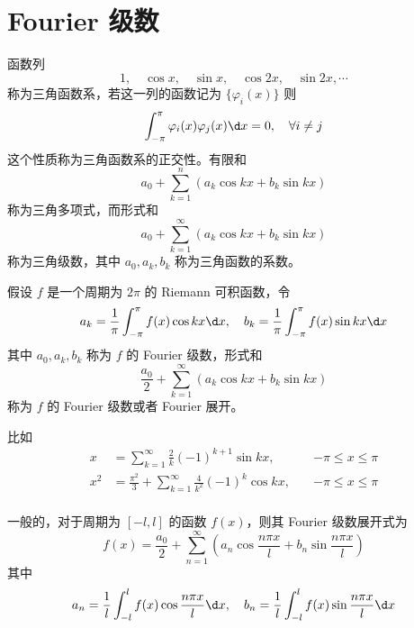 \section{Fourier 级数}

函数列
\[ 1, \quad \cos x, \quad \sin x, \quad \cos 2x, \quad \sin 2x , \cdots \]
称为三角函数系，若这一列的函数记为 $\{\varphi_i(x)\}$ 则
\[ \int_{-\pi}^{\pi} \varphi_i(x) \varphi_j(x) \d x = 0, \quad \forall i \neq j \]
这个性质称为三角函数系的正交性。有限和
\[ a_0 + \sum_{k=1}^n (a_k \cos kx + b_k \sin kx) \]
称为三角多项式，而形式和
\[ a_0 + \sum_{k=1}^\infty (a_k \cos kx + b_k \sin kx) \]
称为三角级数，其中 $a_0, a_k, b_k$ 称为三角函数的系数。

\begin{definition}
	假设 $f$ 是一个周期为 $2\pi$ 的 Riemann 可积函数，令
	\[ a_k = \frac{1}{\pi} \int_{-\pi}^{\pi} f(x) \cos kx \d x, \quad b_k = \frac{1}{\pi} \int_{-\pi}^{\pi} f(x) \sin k x \d x \]
	其中 $a_0, a_k, b_k$ 称为 $f$ 的 Fourier 级数，形式和
	\[ \frac{a_0}{2} + \sum_{k=1}^\infty (a_k \cos k x+ b_k \sin k x) \]
	称为 $f$ 的 Fourier 级数或者 Fourier 展开。
\end{definition}

比如
\[ \begin{aligned}
		x   & = \sum_{k=1}^{\infty} \frac{2}{k} (-1)^{k+1} \sin k x, \quad                   & -\pi \leqslant x \leqslant \pi \\
		x^2 & = \frac{\pi^2}{3} + \sum_{k=1}^{\infty} \frac{4}{k^2} (-1)^{k} \cos k x, \quad & -\pi \leqslant x \leqslant \pi \\
	\end{aligned} \]

一般的，对于周期为 $[-l,l]$ 的函数 $f(x)$，则其 Fourier 级数展开式为
\[ f(x) = \frac{a_0}{2} + \sum_{n=1}^{\infty} \left( a_n \cos \frac{n \pi x}{l} + b_n \sin \frac{n \pi x}{l} \right) \]
其中
\[ a_n = \frac{1}{l} \int_{-l}^{l} f(x) \cos \frac{n \pi x}{l} \d x, \quad b_n = \frac{1}{l} \int_{-l}^{l} f(x) \sin \frac{n \pi x}{l} \d x  \]
